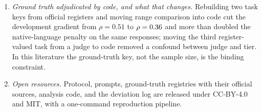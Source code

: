 \begin{enumerate}
  be separated in this sample. We also document that the pre-specified corpus proxy
  assigns the English Wikipedia to every sample country with English as an
  official language, so that it tracks colonial history rather than corpus size.
\item \emph{Ground truth adjudicated by code, and what that changes.} Rebuilding
  two task keys from official registers and moving range comparison into code
  cut the development gradient from $\rho=0.51$ to $\rho=0.36$ and more than
  doubled the native-language penalty on the same responses; moving the third
  register-valued task from a judge to code removed a confound between judge and
  tier. In this literature the ground-truth key, not the sample size, is the
  binding constraint.
\item \emph{Open resources.} Protocol, prompts, ground-truth registries with
  their official sources, analysis code, and the deviation log are released
  under CC-BY-4.0 and MIT, with a one-command reproduction pipeline.
\end{enumerate}
